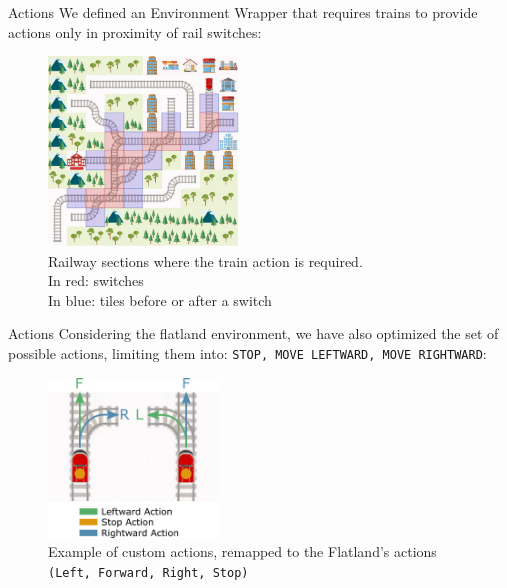 \documentclass[10pt, xcolor={dvipsnames}]{beamer}
\begin{document}
\begin{frame}{Actions}
    We defined an \alert{Environment Wrapper} that requires trains to provide actions only in proximity of rail switches:
    \begin{figure}
        \centering
        \includegraphics[width=0.45\textwidth]{assets/environment/switch_highlights.png}
        \captionsetup{justification=centering}
        \caption*{Railway sections where the train action is required. \\ \textcolor{Bittersweet}{In red: switches}\\ 
        \textcolor{NavyBlue}{In blue: tiles before or after a switch}}
        \label{fig:my_label}
    \end{figure}
\end{frame}


\begin{frame}{Actions}
    Considering the flatland environment, we have also optimized the set of possible actions, limiting them into: \texttt{STOP, MOVE LEFTWARD, MOVE RIGHTWARD}:
    \begin{figure}
        \centering
        \includegraphics[width=0.4\textwidth]{assets/environment/actions.png}
        \caption*{Example of \alert{custom actions}, remapped to the Flatland's actions \texttt{(Left, Forward, Right, Stop)}}
    \end{figure}
\end{frame}
\end{document}
